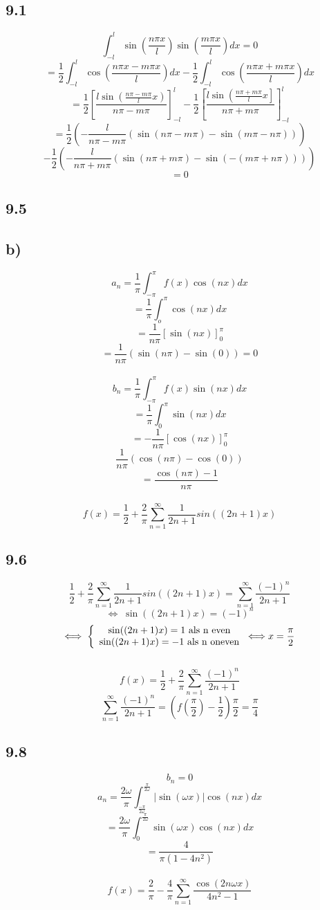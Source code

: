 \documentclass[11pt]{article}
\begin{document}
\subsection*{9.1}
\[
\int_{-l}^l\sin\left(\frac{n\pi x}{l}\right)\sin\left(\frac{m\pi x}{l}\right)dx=0
\]
\[
= \frac{1}{2}\int_{-l}^l\cos\left(\frac{n\pi x - m\pi x}{l}\right)dx - \frac{1}{2}\int_{-l}^l\cos\left(\frac{n\pi x + m\pi x}{l}\right)dx
\]
\[
= \frac{1}{2}\left[\frac{l\sin\left(\frac{n\pi-m\pi}{l}x\right)}{n\pi-m\pi}\right]_{-l}^l
-
\frac{1}{2}\left[\frac{l\sin\left(\frac{n\pi+m\pi}{l}x\right]}{n\pi+m\pi}\right]_{-l}^l
\]
\[
= \frac{1}{2} \left( -\frac{l}{n\pi - m\pi} \left( \sin(n\pi - m\pi)- \sin(m\pi - n\pi) \right) \right)
\]\[
-\frac{1}{2} \left( -\frac{l}{n\pi + m\pi} \left( \sin(n\pi + m\pi)- \sin(-(m\pi + n\pi)) \right) \right)
\]
\[
=0
\]

\subsection*{9.5}
\subsection*{b)}
\[
a_n = \frac{1}{\pi}\int_{-\pi}^\pi f(x)\cos(nx)dx
\]
\[
= \frac{1}{\pi} \int_o^\pi \cos(nx)dx
\]
\[
=\frac{1}{n\pi}\left[\sin(nx)\right]_0^\pi
\]
\[
= \frac{1}{n\pi}(\sin(n\pi)-\sin(0)) = 0
\]\\
\[
b_n = \frac{1}{\pi}\int_{-\pi}^\pi f(x)\sin(nx)dx
\]
\[
= \frac{1}{\pi} \int_0^\pi \sin(nx)dx
\]
\[
= -\frac{1}{n\pi} \left[ \cos(nx) \right]_0^\pi
\]
\[
\frac{1}{n\pi}(\cos(n\pi)-\cos(0))
\]
\[
= \frac{\cos(n\pi)-1}{n\pi}
\]\\
\[
f(x)  = \frac{1}{2} + \frac{2}{\pi} \sum_{n=1}^\infty \frac{1}{2n+1}sin((2n+1)x)
\]

\subsection*{9.6}
\[
\frac{1}{2} + \frac{2}{\pi} \sum_{n=1}^\infty \frac{1}{2n+1}sin((2n+1)x) = \sum_{n=1}^\infty\frac{(-1)^n}{2n+1}
\]
\[
\Longleftrightarrow\; \sin((2n+1)x) = (-1)^n
\]
\[
\Longleftrightarrow\; \left\lbrace \begin{array}{c c}
\sin((2n+1)x) = 1 \text{ als n even}\\ \sin((2n+1)x) = -1 \text{ als n oneven}
\end{array}
\right. \Longleftrightarrow x = \frac{\pi}{2}
\]\\
\[
f(x) = \frac{1}{2} + \frac{2}{\pi} \sum_{n=1}^\infty\frac{(-1)^n}{2n+1}
\]
\[
\sum_{n=1}^\infty\frac{(-1)^n}{2n+1} = (f(\frac{\pi}{2}) - \frac{1}{2})\frac{\pi}{2} = \frac{\pi}{4}
\]

\subsection*{9.8}
\[ b_n =0\]
\[ a_n = \frac{2\omega}{\pi}\int_{\frac{-\pi}{2\omega}}^{\frac{\pi}{2\omega	}} |\sin(\omega x)|\cos(nx)dx
\]
\[
=\frac{2\omega}{\pi}\int_0^{\frac{\pi}{2\omega	}} \sin(\omega x)\cos(nx)dx
\]
\[
=\frac{4}{\pi(1-4n^2)}
\]\\
\[
f(x) = \frac{2}{\pi} - \frac{4}{\pi}\sum_{n=1}^\infty\frac{\cos(2n\omega x)}{4n^2 -1}
\]
\end{document}
